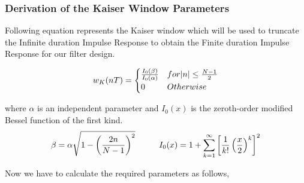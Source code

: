 \documentclass[a4paper,11pt]{article}%
\begin{document}
\subsubsection{Derivation of the Kaiser Window Parameters}

Following equation represents the Kaiser window which will be used to truncate the Infinite duration Impulse Response to obtain the Finite duration Impulse Response for our filter design.

\begin{equation}
w_K(nT) = \begin{cases}
	\frac{I_0(\beta)}{I_0(\alpha)} & for \abs{n}  \leq \frac{N-1}{2} \\
	0 & Otherwise
	\label{kaiser}
\end{cases}
\end{equation}


where $\alpha$ is an independent parameter and $I_0(x)$ is the zeroth-order modified Bessel function of the first kind.\\
\[
\beta = \alpha\sqrt{1-\left(\frac{2n}{N-1}\right)^2} \hspace*{1cm} I_0(x) = 1+\sum_{k=1}^{\infty}\left[\frac{1}{k!}\left(\frac{x}{2}\right)^k\right]^2
 \]

Now we have to calculate the required parameters as follows,
\end{document}
